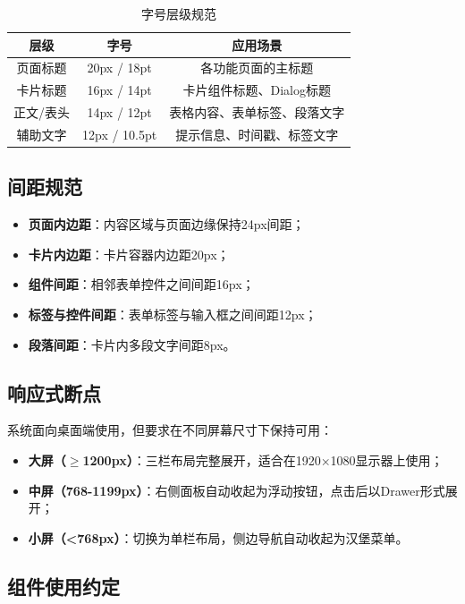 \documentclass{../softeng}
\begin{document}
\begin{table}[htbp]
\centering
\caption{字号层级规范}
\label{tab:font_size}
\begin{tabular}{|c|c|c|}
\hline
\textbf{层级} & \textbf{字号} & \textbf{应用场景} \\
\hline
页面标题 & 20px / 18pt & 各功能页面的主标题 \\
\hline
卡片标题 & 16px / 14pt & 卡片组件标题、Dialog标题 \\
\hline
正文/表头 & 14px / 12pt & 表格内容、表单标签、段落文字 \\
\hline
辅助文字 & 12px / 10.5pt & 提示信息、时间戳、标签文字 \\
\hline
\end{tabular}
\end{table}

\subsection{间距规范}

\begin{itemize}
    \item \textbf{页面内边距}：内容区域与页面边缘保持24px间距；
    \item \textbf{卡片内边距}：卡片容器内边距20px；
    \item \textbf{组件间距}：相邻表单控件之间间距16px；
    \item \textbf{标签与控件间距}：表单标签与输入框之间间距12px；
    \item \textbf{段落间距}：卡片内多段文字间距8px。
\end{itemize}

\subsection{响应式断点}

系统面向桌面端使用，但要求在不同屏幕尺寸下保持可用：

\begin{itemize}
    \item \textbf{大屏（$\ge$1200px）}：三栏布局完整展开，适合在1920×1080显示器上使用；
    \item \textbf{中屏（768-1199px）}：右侧面板自动收起为浮动按钮，点击后以Drawer形式展开；
    \item \textbf{小屏（<768px）}：切换为单栏布局，侧边导航自动收起为汉堡菜单。
\end{itemize}

\subsection{组件使用约定}
\end{document}
